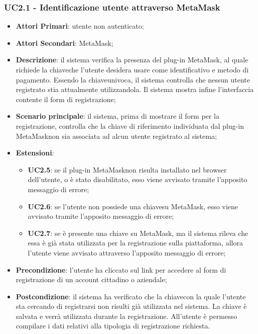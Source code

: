 \subsubsection{UC2.1 - Identificazione utente attraverso MetaMask}
\begin{itemize}
	\item \textbf{Attori Primari}: utente non autenticato;
	\item \textbf{Attori Secondari}: MetaMask\glo;
	\item \textbf{Descrizione}: il sistema verifica la presenza del plug-in MetaMask\glo, al quale richiede la chiave\glosp che l'utente desidera usare come identificativo e metodo di pagamento. Essendo la chiave\glosp univoca, il sistema controlla che nessun utente registrato stia attualmente utilizzandola. Il sistema mostra infine l'interfaccia contente il form di registrazione;
	\item \textbf{Scenario principale}: il sistema, prima di mostrare il form per la registrazione, controlla che la chiave di riferimento individuata dal plug-in MetaMask\glosp non sia associata ad alcun utente registrato al sistema;
	\item \textbf{Estensioni}:
	\begin{itemize}
		\item \textbf{UC2.5}: se il plug-in MetaMask\glosp non risulta installato nel browser dell'utente, o è stato disabilitato, esso viene avvisato tramite l'apposito messaggio di errore;
		\item \textbf{UC2.6}: se l'utente non possiede una chiave\glosp su MetaMask\glo, esso viene avvisato tramite l'apposito messaggio di errore;
		\item \textbf{UC2.7}: se è presente una chiave su MetaMask\glo, ma il sistema rileva che essa è già stata utilizzata per la registrazione sulla piattaforma, allora l'utente viene avvisato attraverso l'apposito messaggio di errore;
	\end{itemize}
	\item \textbf{Precondizione}: l'utente ha cliccato sul link per accedere al form di registrazione di un account cittadino o aziendale;
	\item \textbf{Postcondizione}: il sistema ha verificato che la chiave\glosp con la quale l'utente sta cercando di registrarsi non risulti già utilizzata nel sistema. La chiave è salvata e verrà utilizzata durante la registrazione. All'utente è permesso compilare i dati relativi alla tipologia di registrazione richiesta.
	
\end{itemize}
